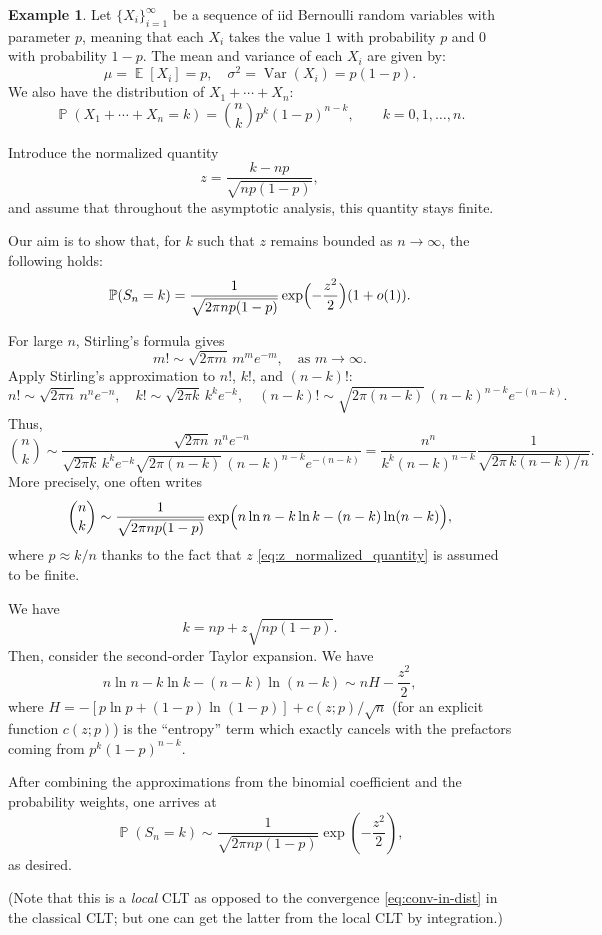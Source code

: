 \documentclass[letterpaper,11pt,oneside,reqno]{article}
\numberwithin{equation}{section}
\theoremstyle{definition}
\newtheorem{example}[proposition]{Example}
\begin{document}
\begin{example}
Let $\{X_i\}_{i=1}^{\infty}$ be a sequence of iid Bernoulli random variables with parameter $p$, meaning that each $X_i$ takes the value $1$ with probability $p$ and $0$ with probability $1 - p$. The mean and variance of each $X_i$ are given by:
\[
	\mu = \operatorname{\mathbb{E}}[X_i] = p, \quad \sigma^2 = \operatorname{\mathrm{Var}}(X_i) = p(1 - p).
\]
We also have the distribution of $X_1+\cdots+X_n$:
\begin{equation*}
	\operatorname{\mathbb{P}}\left( X_1+ \cdots + X_n = k \right) = \binom{n}{k} p^k (1-p)^{n-k},
	\qquad k = 0, 1, \ldots, n.
\end{equation*}

Introduce the normalized quantity
\begin{equation}
	\label{eq:z_normalized_quantity}
	z = \frac{k - np}{\sqrt{np(1-p)}},
\end{equation}
and assume that throughout the asymptotic analysis,
this quantity stays finite.

Our aim is to show that, for $k$ such that $z$ remains bounded as $n\to\infty$, the following holds:
\[
\operatorname{\mathbb{P}}(S_n = k) = \frac{1}{\sqrt{2\pi np(1-p)}} \exp\Bigl( -\frac{z^2}{2} \Bigr) (1+o(1)).
\]

For large $n$, Stirling's formula gives
\[
m! \sim \sqrt{2\pi m}\, m^m e^{-m}, \quad \text{as } m\to\infty.
\]
Apply Stirling's approximation to $n!$, $k!$, and $(n-k)!$:
\[
n! \sim \sqrt{2\pi n}\, n^n e^{-n}, \quad
k! \sim \sqrt{2\pi k}\, k^k e^{-k}, \quad
(n-k)! \sim \sqrt{2\pi (n-k)}\,(n-k)^{n-k} e^{-(n-k)}.
\]
Thus,
\[
\binom{n}{k} \sim \frac{\sqrt{2\pi n}\, n^n e^{-n}}{\sqrt{2\pi k}\, k^k e^{-k}\sqrt{2\pi (n-k)}\,(n-k)^{n-k} e^{-(n-k)}}
= \frac{n^n}{k^k (n-k)^{n-k}}
\frac{1}{\sqrt{2\pi\, k(n-k)/n}}.
\]
More precisely, one often writes
\[
\binom{n}{k} \sim \frac{1}{\sqrt{2\pi np(1-p)}} \exp\Bigl( n\ln n - k\ln k - (n-k)\ln (n-k) \Bigr),
\]
where $p\approx k/n$ thanks to the fact that
$z$ \eqref{eq:z_normalized_quantity} is assumed to be finite.

We have
\[
k = np+ z\sqrt{np(1-p)}.
\]
Then, consider the second-order Taylor expansion. We have
\[
n\ln n - k\ln k - (n-k)\ln (n-k) \sim n H -\frac{z^2}{2},
\]
where $H=-[p\ln p+(1-p)\ln(1-p)]+c(z;p)/\sqrt n$
(for an explicit function $c(z;p)$)
is the
``entropy'' term which exactly cancels with the prefactors coming from $p^k (1-p)^{n-k}$.

After combining the approximations from the binomial coefficient and the probability weights, one arrives at
\[
\operatorname{\mathbb{P}}(S_n = k)
\sim \frac{1}{\sqrt{2\pi np(1-p)}} \exp\left( -\frac{z^2}{2} \right),
\]
as desired.


(Note that this is a \emph{local} CLT as opposed to the convergence
\eqref{eq:conv-in-dist} in the classical CLT; but one can get the latter
from the local CLT by integration.)

\end{example}
\end{document}
